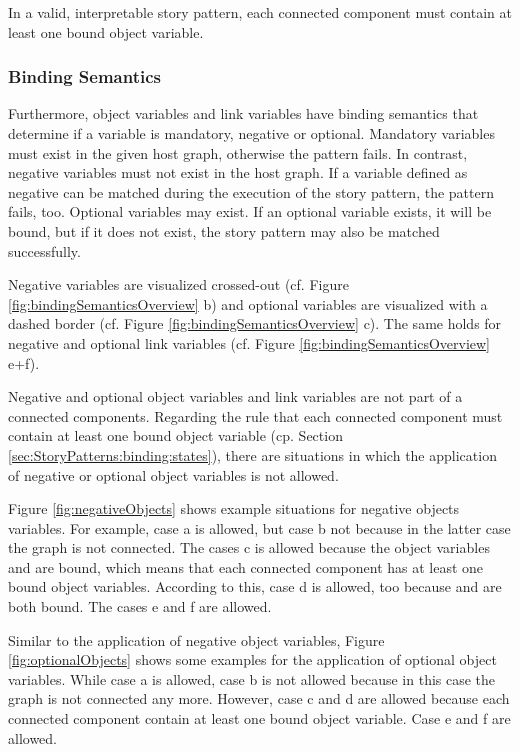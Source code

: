 In a valid, interpretable story pattern, each connected component must contain
at least one bound object variable.



\subsubsection{Binding Semantics}
\label{sec:StoryPatterns:binding:semantics}
Furthermore, object variables and link variables have binding semantics that
determine if a variable is mandatory, negative or optional.
Mandatory variables must exist in the given host graph, otherwise the pattern
fails. 
In contrast, negative variables must not exist in the host graph. If a variable
defined as negative can be matched during the execution of the story pattern,
the pattern fails, too.
Optional variables may exist. If an optional variable exists, it will be
bound, but if it does not exist, the story pattern may also be matched
successfully.

Negative variables are visualized crossed-out (cf. Figure
\ref{fig:bindingSemanticsOverview} b) and optional variables are visualized with
a dashed border (cf. Figure \ref{fig:bindingSemanticsOverview} c).
The same holds for negative and optional link variables (cf. Figure
\ref{fig:bindingSemanticsOverview} e+f).

Negative and optional object variables and link variables are not part of a
connected components. Regarding the rule that each connected component must contain
at least one bound object variable (cp. Section
\ref{sec:StoryPatterns:binding:states}), there are situations in which the
application of negative or optional object variables is not allowed. 

Figure \ref{fig:negativeObjects} shows example situations for negative objects
variables. 
For example, case a is allowed, but case b not because in the latter case the
graph is not connected.
The cases c is allowed because the object variables  and  are bound,
which means that each connected component has at least one bound object variables.
According to this, case d is allowed, too because  and  are both
bound. The cases e and f are allowed.

Similar to the application of negative object
variables, Figure \ref{fig:optionalObjects} shows some examples for the application of optional object variables. While case a is allowed, case b is not allowed because in this case the graph is not connected any more.
However, case c and d are allowed because each connected component contain at
least one bound object variable.
Case e and f are allowed.

